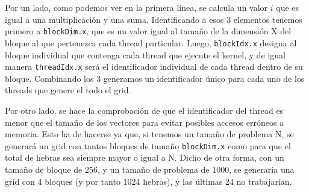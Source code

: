 Por un lado, como podemos ver en la primera línea, se calcula un valor $i$ que es igual a una multiplicación y una suma. Identificando a esos 3 elementos tenemos primero a \texttt{blockDim.x}, que es un valor igual al tamaño de la dimensión X del bloque al que pertenezca cada thread particular. Luego, \texttt{blockIdx.x} designa al bloque individual que contenga cada thread que ejecute el kernel, y de igual manera \texttt{threadIdx.x} será el identificador individual de cada thread dentro de su bloque. Combinando los 3 generamos un identificador único para cada uno de los threads que genere el todo el grid.

Por otro lado, se hace la comprobación de que el identificador del thread es menor que el tamaño de los vectores para evitar posibles accesos erróneos a memoria. Esto ha de hacerse ya que, si tenemos un tamaño de problema N, se generará un grid con tantos bloques de tamaño \texttt{blockDim.x} como para que el total de hebras sea siempre mayor o igual a N. Dicho de otra forma, con un tamaño de bloque de 256, y un tamaño de problema de 1000, se generaría una grid con 4 bloques (y por tanto 1024 hebras), y las últimas 24 no trabajarían.